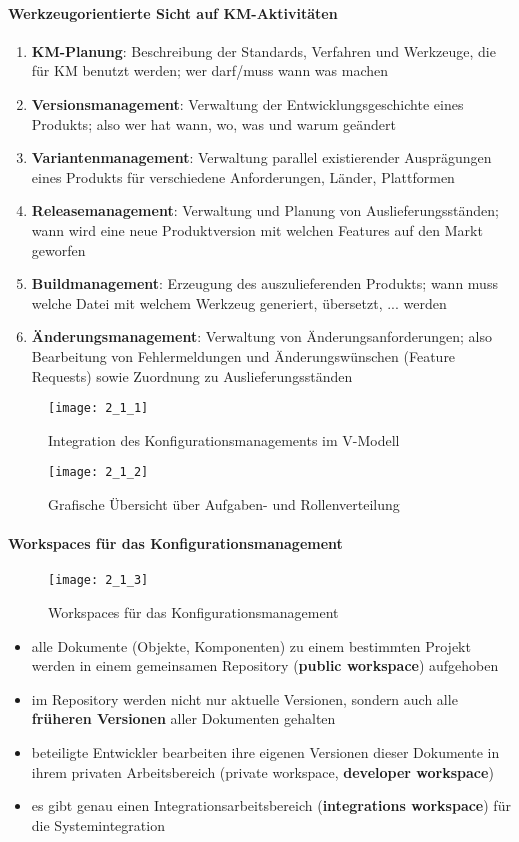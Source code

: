 \paragraph{Werkzeugorientierte Sicht auf KM-Aktivitäten}
\begin{enumerate}
	\item \textbf{KM-Planung}: Beschreibung der Standards, Verfahren und Werkzeuge, die für KM benutzt werden; wer darf/muss wann was machen
	\item \textbf{Versionsmanagement}: Verwaltung der Entwicklungsgeschichte eines Produkts; also wer hat wann, wo, was und warum geändert
	\item \textbf{Variantenmanagement}: Verwaltung parallel existierender Ausprägungen eines Produkts für verschiedene Anforderungen, Länder, Plattformen
	\item \textbf{Releasemanagement}: Verwaltung und Planung von Auslieferungsständen; wann wird eine neue Produktversion mit welchen Features auf den Markt geworfen  
	\item \textbf{Buildmanagement}: Erzeugung des auszulieferenden Produkts; wann muss welche Datei mit welchem Werkzeug generiert, übersetzt, ... werden
	\item \textbf{Änderungsmanagement}: Verwaltung von Änderungsanforderungen; also Bearbeitung von Fehlermeldungen und Änderungswünschen (Feature Requests) sowie Zuordnung zu Auslieferungsständen
\end{enumerate}
\begin{figure}[h]
	\caption{Integration des Konfigurationsmanagements im V-Modell}
	\centering
	\texttt{[image: 2\_1\_1]}
\end{figure}
\begin{figure}[h]
	\caption{Grafische Übersicht über Aufgaben- und Rollenverteilung}
	\centering
	\texttt{[image: 2\_1\_2]}
\end{figure}
\paragraph{Workspaces für das Konfigurationsmanagement}
\begin{figure}[h]
	\caption{Workspaces für das Konfigurationsmanagement}
	\centering
	\texttt{[image: 2\_1\_3]}
\end{figure}
\begin{itemize}
	\item alle Dokumente (Objekte, Komponenten) zu einem bestimmten Projekt werden in	einem gemeinsamen Repository (\textbf{public workspace}) aufgehoben
	\item im Repository werden nicht nur aktuelle Versionen, sondern auch alle \textbf{früheren Versionen} aller Dokumenten gehalten
	\item beteiligte Entwickler bearbeiten ihre eigenen Versionen dieser Dokumente in 
	ihrem privaten Arbeitsbereich (private workspace, \textbf{developer workspace}) 
	\item es gibt genau einen Integrationsarbeitsbereich (\textbf{integrations workspace}) für die Systemintegration
\end{itemize}
